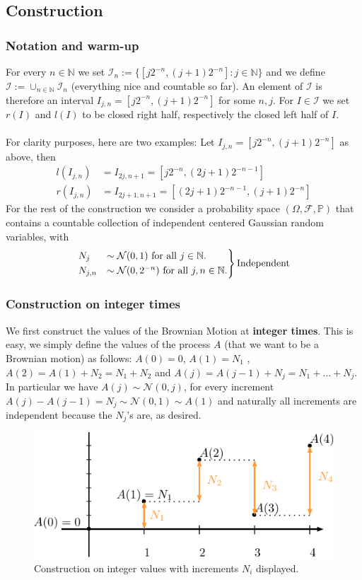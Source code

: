 \documentclass[../mainfile.tex]{subfiles}
\begin{document}
\subsection{Construction}
\subsubsection{Notation and warm-up}
For every $n \in \mathbb{N}$ we set $\mathcal{I}_n:= \{ [j2^{-n}, (j+1)2^{-n}] : j \in \mathbb{N}\}$ and we define $\mathcal{I}:= \cup_{n \in \mathbb{N}} \mathcal{I}_n$ (everything nice and countable so far). An element of $\mathcal{I}$ is therefore an interval $I_{j,n}=[j2^{-n},(j+1)2^{-n}]$ for some $n,j$. For $I \in \mathcal{I}$ we set $r(I)$ and $l(I)$ to be closed right half, respectively the closed left half of $I$. 
\\\\
For clarity purposes, here are two examples: Let $I_{j,n}=[j2^{-n},(j+1)2^{-n}]$ as above, then
\begin{align*}
l(I_{j,n})&=I_{2j,n+1} =[j2^{-n}, (2j+1)2^{-n-1}] \\
r(I_{j,n})&=I_{2j+1,n+1}=[(2j+1)2^{-n-1},(j+1)2^{-n}]
\end{align*}
For the rest of the construction we consider a probability space $(\Omega, \mathcal{F}, \mathbb{P})$ that contains a countable collection of independent centered Gaussian random variables, with 
\begin{equation*}
\begin{rcases}
N_j &\sim \mathcal{N}(0,1) \text{ for all } j \in \mathbb{N}.\\
N_{j,n} &\sim \mathcal{N}(0, 2^{-n}) \text{ for all } j,n \in \mathbb{N}. 
\end{rcases}
\text{Independent}
\end{equation*}
\subsubsection{Construction on integer times}
We first construct the values of the Brownian Motion at \textbf{integer times}. This is easy, we simply define the values of the process $A$ (that we want to be a Brownian motion) as follows: $A(0)=0$, $A(1)=N_1$ ,$A(2)=A(1)+N_2=N_1+N_2$ and $A(j)=A(j-1)+N_j=N_1 + \dots + N_j$. In particular we have $A(j)\sim \mathcal{N}(0,j)$, for every increment $A(j)-A(j-1)=N_j \sim \mathcal{N}(0,1) \sim A(1)$ and naturally all increments are independent because the $N_j$'s are, as desired. 
\begin{figure}[hbtp]
\centering
\includegraphics[scale=1]{figure1.pdf}
\caption{Construction on integer values with increments $N_i$ displayed.}
\end{figure}
\newpage
\end{document}
